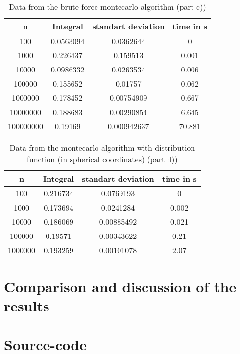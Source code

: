 \documentclass[10pt,a4paper]{article}
\begin{document}
\begin{table}[h]
\centering
\caption{Data from the brute force montecarlo algorithm (part c))}
\label{Data from the brute force montecarlo algorithm (part c))}
\begin{tabular}{c|c|c|c}
n & Integral & standart deviation & time in s \\
\hline\hline
100 & 0.0563094 & 0.0362644 & 0 \\
1000 & 0.226437 & 0.159513 & 0.001 \\
10000 & 0.0986332 & 0.0263534 & 0.006 \\
100000 & 0.155652 & 0.01757 & 0.062 \\
1000000 & 0.178452 & 0.00754909 & 0.667 \\
10000000 & 0.188683 & 0.00290854 & 6.645 \\
100000000 & 0.19169 & 0.000942637 & 70.881 
\end{tabular}
\end{table}

\begin{table}[h]
\centering
\caption{Data from the montecarlo algorithm with distribution function (in spherical coordinates) (part d))}
\label{Data from the  montecarlo algorithm (part d))}
\begin{tabular}{c|c|c|c}
n & Integral & standart deviation & time in s \\
\hline\hline
100 & 0.216734 & 0.0769193 & 0 \\
1000 & 0.173694 & 0.0241284 & 0.002 \\
10000 & 0.186069 & 0.00885492 & 0.021 \\
100000 & 0.19571 & 0.00343622 & 0.21 \\
1000000 & 0.193259 & 0.00101078 & 2.07 
\end{tabular}
\end{table}

\section{Comparison and discussion of the results}

\section{Source-code}
\end{document}
